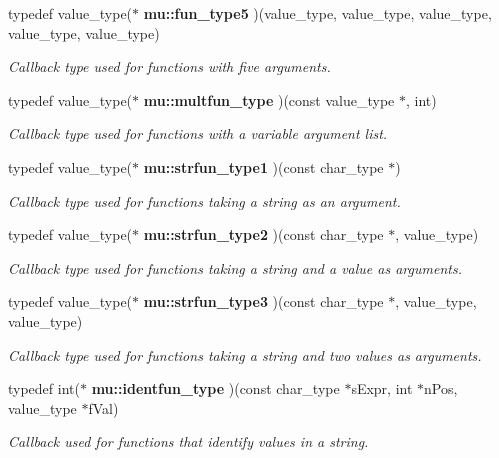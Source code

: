 \begin{CompactItemize}
typedef value\_\-type($\ast$ {\bf mu::fun\_\-type5} )(value\_\-type, value\_\-type, value\_\-type, value\_\-type, value\_\-type)
\begin{CompactList}\small\item\em Callback type used for functions with five arguments. \item\end{CompactList}\item 
typedef value\_\-type($\ast$ {\bf mu::multfun\_\-type} )(const value\_\-type $\ast$, int)
\begin{CompactList}\small\item\em Callback type used for functions with a variable argument list. \item\end{CompactList}\item 
typedef value\_\-type($\ast$ {\bf mu::strfun\_\-type1} )(const char\_\-type $\ast$)
\begin{CompactList}\small\item\em Callback type used for functions taking a string as an argument. \item\end{CompactList}\item 
typedef value\_\-type($\ast$ {\bf mu::strfun\_\-type2} )(const char\_\-type $\ast$, value\_\-type)
\begin{CompactList}\small\item\em Callback type used for functions taking a string and a value as arguments. \item\end{CompactList}\item 
typedef value\_\-type($\ast$ {\bf mu::strfun\_\-type3} )(const char\_\-type $\ast$, value\_\-type, value\_\-type)
\begin{CompactList}\small\item\em Callback type used for functions taking a string and two values as arguments. \item\end{CompactList}\item 
typedef int($\ast$ {\bf mu::identfun\_\-type} )(const char\_\-type $\ast$sExpr, int $\ast$nPos, value\_\-type $\ast$fVal)
\begin{CompactList}\small\item\em Callback used for functions that identify values in a string. \item\end{CompactList}\item 

\end{CompactItemize}
